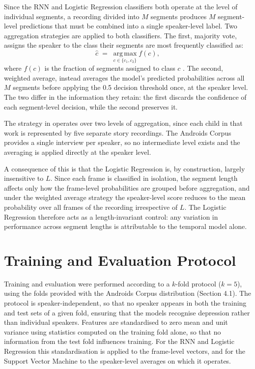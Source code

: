 \documentclass{mproj}
\begin{document}
Since the RNN and Logistic Regression classifiers both operate at the level of individual segments, a recording divided into $M$ segments produces $M$ segment-level predictions that must be combined into a single speaker-level label. Two aggregation strategies are applied to both classifiers. The first, majority vote, assigns the speaker to the class their segments are most frequently classified as:
%
\begin{equation}
\hat{c} \;=\; \operatorname*{arg\,max}_{c \in \{c_1, c_2\}} f(c),
\end{equation}
%
where $f(c)$ is the fraction of segments assigned to class $c$ \cite{alsofyani2021}. The second, weighted average, instead averages the model's predicted probabilities across all $M$ segments before applying the 0.5 decision threshold once, at the speaker level. The two differ in the information they retain: the first discards the confidence of each segment-level decision, while the second preserves it.

The strategy in \cite{alsofyani2021} operates over two levels of aggregation, since each child in that work is represented by five separate story recordings. The Androids Corpus provides a single interview per speaker, so no intermediate level exists and the averaging is applied directly at the speaker level.

A consequence of this is that the Logistic Regression is, by construction, largely insensitive to $L$. Since each frame is classified in isolation, the segment length affects only how the frame-level probabilities are grouped before aggregation, and under the weighted average strategy the speaker-level score reduces to the mean probability over all frames of the recording irrespective of $L$. The Logistic Regression therefore acts as a length-invariant control: any variation in performance across segment lengths is attributable to the temporal model alone.

\section{Training and Evaluation Protocol}\label{sec:training}

Training and evaluation were performed according to a $k$-fold protocol ($k = 5$), using the folds provided with the Androids Corpus distribution (Section 4.1). The protocol is speaker-independent, so that no speaker appears in both the training and test sets of a given fold, ensuring that the models recognise depression rather than individual speakers. Features are standardised to zero mean and unit variance using statistics computed on the training fold alone, so that no information from the test fold influences training. For the RNN and Logistic Regression this standardisation is applied to the frame-level vectors, and for the Support Vector Machine to the speaker-level averages on which it operates.
\end{document}
